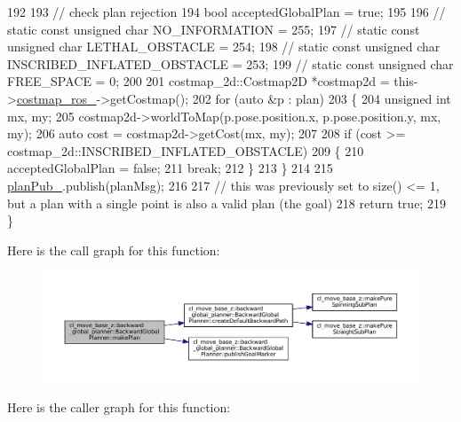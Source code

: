 \begin{DoxyCode}
192 
193         \textcolor{comment}{// check plan rejection}
194     \textcolor{keywordtype}{bool} acceptedGlobalPlan = \textcolor{keyword}{true};
195 
196     \textcolor{comment}{// static const unsigned char NO\_INFORMATION = 255;}
197     \textcolor{comment}{// static const unsigned char LETHAL\_OBSTACLE = 254;}
198     \textcolor{comment}{// static const unsigned char INSCRIBED\_INFLATED\_OBSTACLE = 253;}
199     \textcolor{comment}{// static const unsigned char FREE\_SPACE = 0;}
200 
201     costmap\_2d::Costmap2D *costmap2d = this->\hyperlink{classcl__move__base__z_1_1backward__global__planner_1_1BackwardGlobalPlanner_a7103c15e6540a514acd421c3c6e194a4}{costmap\_ros\_}->getCostmap();
202     \textcolor{keywordflow}{for} (\textcolor{keyword}{auto} &p : plan)
203     \{
204         \textcolor{keywordtype}{unsigned} \textcolor{keywordtype}{int} mx, my;
205         costmap2d->worldToMap(p.pose.position.x, p.pose.position.y, mx, my);
206         \textcolor{keyword}{auto} cost = costmap2d->getCost(mx, my);
207 
208         \textcolor{keywordflow}{if} (cost >= costmap\_2d::INSCRIBED\_INFLATED\_OBSTACLE)
209         \{
210             acceptedGlobalPlan = \textcolor{keyword}{false};
211             \textcolor{keywordflow}{break};
212         \}
213     \}
214     
215     \hyperlink{classcl__move__base__z_1_1backward__global__planner_1_1BackwardGlobalPlanner_a561eab039140948c52ec928c191f3f43}{planPub\_}.publish(planMsg);
216 
217     \textcolor{comment}{// this was previously set to size() <= 1, but a plan with a single point is also a valid plan (the
       goal)}
218     \textcolor{keywordflow}{return} \textcolor{keyword}{true};
219 \}
\end{DoxyCode}
Here is the call graph for this function\+:
\nopagebreak
\begin{figure}[H]
\begin{center}
\leavevmode
\includegraphics[width=350pt]{classcl__move__base__z_1_1backward__global__planner_1_1BackwardGlobalPlanner_a3f1f3c81e7c52c9305544fd793741a41_cgraph}
\end{center}
\end{figure}
Here is the caller graph for this function\+:
\nopagebreak
